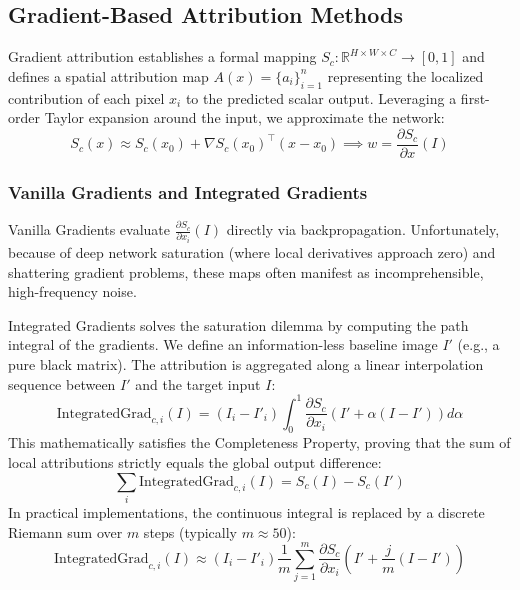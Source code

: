 \subsection{Gradient-Based Attribution Methods}

Gradient attribution establishes a formal mapping $S_c: \mathbb{R}^{H \times W \times C} \to [0,1]$ and defines a spatial attribution map $A(x) = \{a_i\}_{i=1}^n$ representing the localized contribution of each pixel $x_i$ to the predicted scalar output. Leveraging a first-order Taylor expansion around the input, we approximate the network:
\begin{equation}
S_c(x) \approx S_c(x_0) + \nabla S_c(x_0)^\top (x - x_0) \implies w = \frac{\partial S_c}{\partial x}(I)
\end{equation}

\subsubsection{Vanilla Gradients and Integrated Gradients}
Vanilla Gradients evaluate $\frac{\partial S_c}{\partial x_i}(I)$ directly via backpropagation. Unfortunately, because of deep network saturation (where local derivatives approach zero) and shattering gradient problems, these maps often manifest as incomprehensible, high-frequency noise.

Integrated Gradients solves the saturation dilemma by computing the path integral of the gradients. We define an information-less baseline image $I'$ (e.g., a pure black matrix). The attribution is aggregated along a linear interpolation sequence between $I'$ and the target input $I$:
\begin{equation}
\text{IntegratedGrad}_{c,i}(I) = (I_i - I'_i) \int_0^1 \frac{\partial S_c}{\partial x_i}(I' + \alpha(I - I')) d\alpha
\end{equation}
This mathematically satisfies the Completeness Property, proving that the sum of local attributions strictly equals the global output difference:
\begin{equation}
\sum_{i} \text{IntegratedGrad}_{c,i}(I) = S_c(I) - S_c(I')
\end{equation}
In practical implementations, the continuous integral is replaced by a discrete Riemann sum over $m$ steps (typically $m \approx 50$):
\begin{equation}
\text{IntegratedGrad}_{c,i}(I) \approx (I_i - I'_i) \frac{1}{m} \sum_{j=1}^m \frac{\partial S_c}{\partial x_i}\left(I' + \frac{j}{m}(I - I')\right)
\end{equation}

